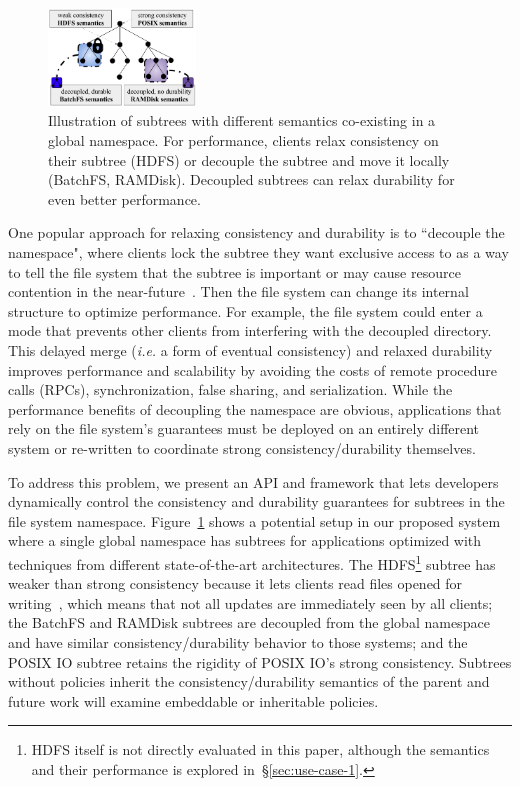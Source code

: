 \begin{figure}[tb] \centering
\includegraphics[width=0.35\textwidth]{figures/subtree-policies1.png}
\caption{Illustration of subtrees with different semantics co-existing in a
global namespace.  For performance, clients  relax consistency on their
subtree (HDFS) or decouple the subtree and move it locally (BatchFS, RAMDisk).
Decoupled subtrees can relax durability for even better performance.
}\label{fig:subtree-policies} \end{figure}

One popular approach for relaxing consistency and durability is to ``decouple
the namespace", where clients lock the subtree they want exclusive access to as
a way to tell the file system that the subtree is important or may cause
resource contention in the near-future~\cite{grider:pdsw2015-marfs,
zheng:pdsw2015-deltafs, zheng:pdsw2014-batchfs, ren:sc2014-indexfs,
bent:slides-twotiers}. Then the file system can change its internal structure
to optimize performance. For example, the file system could enter a mode that
prevents other clients from interfering with the decoupled directory.  This
delayed merge ({\it i.e.} a form of eventual consistency) and relaxed
durability improves performance and scalability by avoiding the costs of remote
procedure calls (RPCs), synchronization, false sharing, and serialization.
While the performance benefits of decoupling the namespace are obvious,
applications that rely on the file system's guarantees must be deployed on an
entirely different system or re-written to coordinate strong
consistency/durability themselves.

To address this problem, we present an API and framework that lets developers
dynamically control the consistency and durability guarantees for subtrees in
the file system namespace.  Figure~\ref{fig:subtree-policies} shows a potential
setup in our proposed system where a single global namespace has subtrees for
applications optimized with techniques from different state-of-the-art
architectures.  The HDFS\footnote{HDFS itself is not directly evaluated in this
paper, although the semantics and their performance is explored
in~\S\ref{sec:use-case-1}.} subtree has weaker than strong consistency because
it lets clients read files opened for
writing~\cite{hakimzadeh:dais14-hdfs-consistency}, which means that not all
updates are immediately seen by all clients; the BatchFS and RAMDisk subtrees
are decoupled from the global namespace and have similar consistency/durability
behavior to those systems; and the POSIX IO subtree retains the rigidity of
POSIX IO's strong consistency.  Subtrees without policies inherit the
consistency/durability semantics of the parent and future work will examine
embeddable or inheritable policies.

